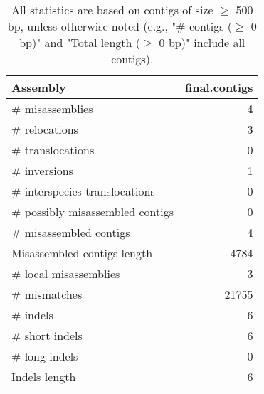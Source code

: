 \documentclass[12pt,a4paper]{article}
\begin{document}
\begin{table}[ht]
\begin{center}
\caption{All statistics are based on contigs of size $\geq$ 500 bp, unless otherwise noted (e.g., "\# contigs ($\geq$ 0 bp)" and "Total length ($\geq$ 0 bp)" include all contigs).}
\begin{tabular}{|l*{1}{|r}|}
\hline
Assembly & final.contigs \\ \hline
\# misassemblies & 4 \\ \hline
\hspace{5mm}\# relocations & 3 \\ \hline
\hspace{5mm}\# translocations & 0 \\ \hline
\hspace{5mm}\# inversions & 1 \\ \hline
\hspace{5mm}\# interspecies translocations & 0 \\ \hline
\# possibly misassembled contigs & 0 \\ \hline
\# misassembled contigs & 4 \\ \hline
Misassembled contigs length & 4784 \\ \hline
\# local misassemblies & 3 \\ \hline
\# mismatches & 21755 \\ \hline
\# indels & 6 \\ \hline
\hspace{5mm}\# short indels & 6 \\ \hline
\hspace{5mm}\# long indels & 0 \\ \hline
Indels length & 6 \\ \hline
\end{tabular}
\end{center}
\end{table}
\end{document}
